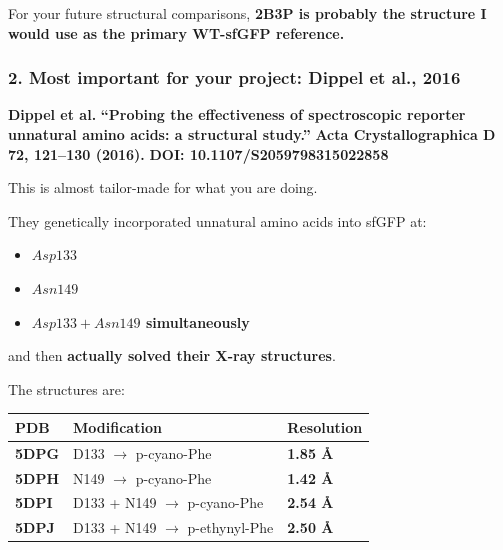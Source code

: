 \documentclass{article}
\begin{document}
\href{https://www.nature.com/articles/nbt1172}{\textbullet}
\href{https://www.rcsb.org/structure/2B3P}{\textbullet}

For your future structural comparisons, \textbf{2B3P is probably the structure I would use as the primary WT-sfGFP reference.}

\subsubsection*{2. Most important for your project: Dippel et al., 2016}

\textbf{Dippel et al.}
\textbf{``Probing the effectiveness of spectroscopic reporter unnatural amino acids: a structural study.''}
\textbf{Acta Crystallographica D 72, 121--130 (2016).}
\textbf{DOI: 10.1107/S2059798315022858}

This is almost tailor-made for what you are doing.

They genetically incorporated unnatural amino acids into sfGFP at:

\begin{itemize}
    \item \textbf{\(Asp133\)}
    \item \textbf{\(Asn149\)}
    \item \textbf{\(Asp133 + Asn149\) simultaneously}
\end{itemize}

and then \textbf{actually solved their X-ray structures}. \href{https://pmc.ncbi.nlm.nih.gov/articles/PMC4756619/}{\textbullet}

The structures are:

\begin{table}[H]\noindent\begin{tabularx}{\linewidth}{LLL}
\hline
PDB & Modification & Resolution \\ \hline
\textbf{5DPG} & D133 \(\rightarrow\) p-cyano-Phe & \textbf{1.85 \AA} \\ \hline
\textbf{5DPH} & N149 \(\rightarrow\) p-cyano-Phe & \textbf{1.42 \AA} \\ \hline
\textbf{5DPI} & D133 + N149 \(\rightarrow\) p-cyano-Phe & \textbf{2.54 \AA} \\ \hline
\textbf{5DPJ} & D133 + N149 \(\rightarrow\) p-ethynyl-Phe & \textbf{2.50 \AA} \\ \hline
\end{tabularx}\end{table}

\href{https://www.rcsb.org/structure/5DPG}{\textbullet}
\end{document}
